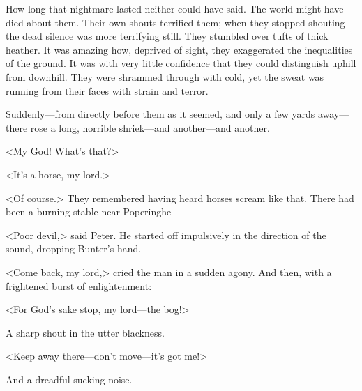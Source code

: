 How long that nightmare lasted neither could have said. The world might have died about them. Their own shouts terrified them; when they stopped shouting the dead silence was more terrifying still. They stumbled over tufts of thick heather. It was amazing how, deprived of sight, they exaggerated the inequalities of the ground. It was with very little confidence that they could distinguish uphill from downhill. They were shrammed through with cold, yet the sweat was running from their faces with strain and terror.

Suddenly—from directly before them as it seemed, and only a few yards away—there rose a long, horrible shriek—and another—and another.

<My God! What's that?>

<It's a horse, my lord.>

<Of course.> They remembered having heard horses scream like that. There had been a burning stable near Poperinghe—

<Poor devil,> said Peter. He started off impulsively in the direction of the sound, dropping Bunter's hand.

<Come back, my lord,> cried the man in a sudden agony. And then, with a frightened burst of enlightenment:

<For God's sake stop, my lord—the bog!>

A sharp shout in the utter blackness.

<Keep away there—don't move—it's got me!>

And a dreadful sucking noise.

